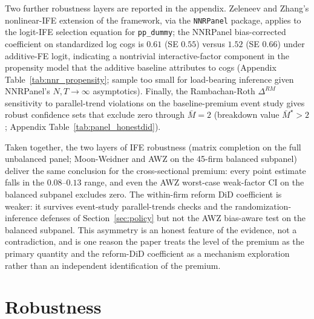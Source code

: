 \documentclass[11pt]{article}
\begin{document}
Two further robustness layers are reported in the appendix. Zeleneev and Zhang's \cite{ZeleneevZhang2026} nonlinear-IFE extension of the framework, via the \texttt{NNRPanel} package, applies to the logit-IFE selection equation for \texttt{pp\_dummy}; the NNRPanel bias-corrected coefficient on standardized log cogs is $0.61$ (SE $0.55$) versus $1.52$ (SE $0.66$) under additive-FE logit, indicating a nontrivial interactive-factor component in the propensity model that the additive baseline attributes to cogs (Appendix Table~\ref{tab:nnr_propensity}; sample too small for load-bearing inference given NNRPanel's $N, T \to \infty$ asymptotics). Finally, the Rambachan-Roth \cite{RambachanRoth2023} $\Delta^{RM}$ sensitivity to parallel-trend violations on the baseline-premium event study gives robust confidence sets that exclude zero through $\bar M = 2$ (breakdown value $\bar M^\star > 2$; Appendix Table~\ref{tab:panel_honestdid}).

Taken together, the two layers of IFE robustness (matrix completion on the full unbalanced panel; Moon-Weidner and AWZ on the 45-firm balanced subpanel) deliver the same conclusion for the cross-sectional premium: every point estimate falls in the $0.08$--$0.13$ range, and even the AWZ worst-case weak-factor CI on the balanced subpanel excludes zero. The within-firm reform DiD coefficient is weaker: it survives event-study parallel-trends checks and the randomization-inference defenses of Section~\ref{sec:policy} but not the AWZ bias-aware test on the balanced subpanel. This asymmetry is an honest feature of the evidence, not a contradiction, and is one reason the paper treats the level of the premium as the primary quantity and the reform-DiD coefficient as a mechanism exploration rather than an independent identification of the premium.


\section{Robustness}\label{sec:robustness}
\end{document}
